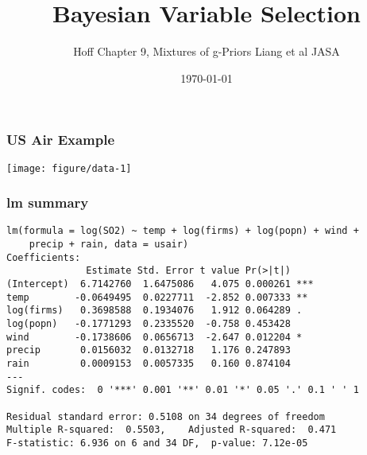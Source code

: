 \documentclass{beamer}\usepackage[]{graphicx}\usepackage[]{color}
\title{Bayesian Variable Selection}
\author{Hoff Chapter 9,  Mixtures of g-Priors Liang et al JASA}
\date{\today}
\makeatletter
\def\maxwidth{ %
  \ifdim\Gin@nat@width>\linewidth
    \linewidth
  \else
    \Gin@nat@width
  \fi
}
\newenvironment{kframe}{%
 \def\at@end@of@kframe{}%
 \ifinner\ifhmode%
  \def\at@end@of@kframe{\end{minipage}}%
  \begin{minipage}{\columnwidth}%
 \fi\fi%
 \def\FrameCommand##1{\hskip\@totalleftmargin \hskip-\fboxsep
 \colorbox{shadecolor}{##1}\hskip-\fboxsep
     \hskip-\linewidth \hskip-\@totalleftmargin \hskip\columnwidth}%
 \MakeFramed {\advance\hsize-\width
   \@totalleftmargin\z@ \linewidth\hsize
   \@setminipage}}%
 {\par\unskip\endMakeFramed%
 \at@end@of@kframe}
\newenvironment{knitrout}{}{} %
\makeatother
\begin{document}
\maketitle
\begin{frame}[fragile]  \frametitle{US Air Example}

\begin{knitrout}
\color{fgcolor}

{\centering \texttt{[image: figure/data-1]} 

}



\end{knitrout}

\end{frame}

\begin{frame}[fragile] \frametitle{lm summary}
\begin{knitrout}
\color{fgcolor}\begin{kframe}
\begin{verbatim}
lm(formula = log(SO2) ~ temp + log(firms) + log(popn) + wind +  
    precip + rain, data = usair) 
Coefficients: 
              Estimate Std. Error t value Pr(>|t|)     
(Intercept)  6.7142760  1.6475086   4.075 0.000261 *** 
temp        -0.0649495  0.0227711  -2.852 0.007333 **  
log(firms)   0.3698588  0.1934076   1.912 0.064289 .   
log(popn)   -0.1771293  0.2335520  -0.758 0.453428     
wind        -0.1738606  0.0656713  -2.647 0.012204 *   
precip       0.0156032  0.0132718   1.176 0.247893     
rain         0.0009153  0.0057335   0.160 0.874104     
--- 
Signif. codes:  0 '***' 0.001 '**' 0.01 '*' 0.05 '.' 0.1 ' ' 1 
 
Residual standard error: 0.5108 on 34 degrees of freedom 
Multiple R-squared:  0.5503,	Adjusted R-squared:  0.471  
F-statistic: 6.936 on 6 and 34 DF,  p-value: 7.12e-05 
 
\end{verbatim}
\end{kframe}
\end{knitrout}

\end{frame}
\end{document}
